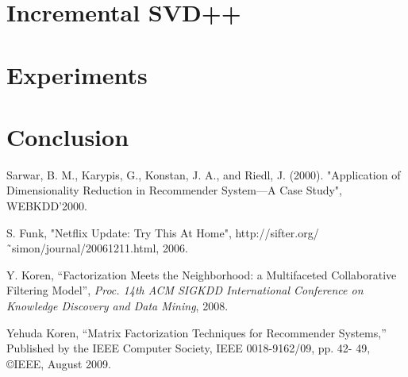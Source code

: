\documentclass[conference]{IEEEtran}
\begin{document}
\section{Incremental SVD++}

\section{Experiments}


\section{Conclusion}


\begin{thebibliography}{10}
Sarwar, B. M., Karypis, G., Konstan, J. A., and Riedl, J. (2000). "Application of Dimensionality Reduction in Recommender System—A Case Study", WEBKDD’2000.

S. Funk, "Netflix Update: Try This At Home", http://sifter.org/˜simon/journal/20061211.html, 2006.

Y. Koren, “Factorization Meets the Neighborhood: a Multifaceted Collaborative Filtering
Model”, \emph{Proc. 14th ACM SIGKDD International Conference on Knowledge Discovery and
Data Mining}, 2008.

Yehuda Koren, “Matrix Factorization Techniques for Recommender Systems,” Published by the IEEE Computer Society, IEEE 0018-9162/09, pp. 42- 49, ©IEEE, August 2009.

\end{thebibliography}
\end{document}
